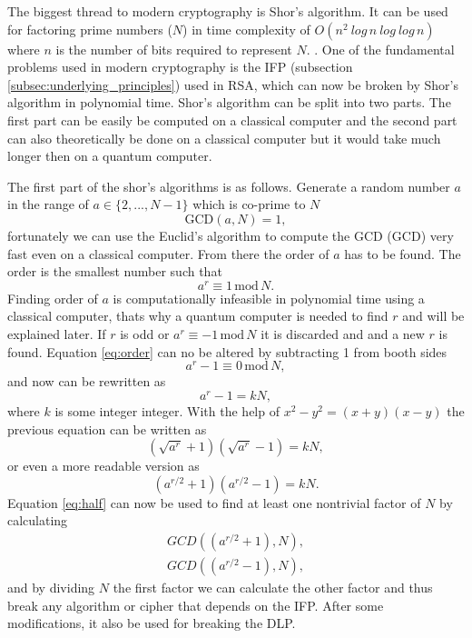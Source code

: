 The biggest thread to modern cryptography is Shor's algorithm. It can be used for factoring prime numbers ($N$) in time complexity of $O(n^2\ log\,n\ log\ log\,n)$ where $n$ is the number of bits required to represent $N$. \cite{Yanofsky2008}. One of the fundamental problems used in modern cryptography is the IFP (subsection \ref{subsec:underlying_principles}) used in RSA, which can now be broken by Shor’s algorithm in polynomial time. Shor's algorithm can be split into two parts. The first part can be easily be computed on a classical computer and the second part can also theoretically be done on a classical computer but it would take much longer then on a quantum computer. 

The first part of the shor's algorithms is as follows. Generate a random number $a$ in the range of $a\in\{2,...,N-1\}$ which is co-prime to $N$
\begin{equation}
  \mathrm{GCD}(a, N) = 1,
\end{equation}
fortunately we can use the Euclid's algorithm to compute the GCD (\acl{GCD}) very fast even on a classical computer. From there the order of $a$ has to be found. The order is the smallest number such that
\begin{equation}
  \label{eq:order}
  a^r \equiv 1\,\mathrm{mod}\,N.
\end{equation}
Finding order of $a$ is computationally infeasible in polynomial time using a classical computer, thats why a quantum computer is needed to find $r$ and will be explained later. If $r$ is odd or $a^r\equiv-1\,\mathrm{mod}\,N$ it is discarded and and a new $r$ is found. Equation \ref{eq:order} can no be altered by subtracting 1 from booth sides
\begin{equation}
  a^r -1\equiv 0\,\mathrm{mod}\,N,
\end{equation}
and now can be rewritten as
\begin{equation}
  a^r -1=kN,
\end{equation}
where $k$ is some integer integer. With the help of $x^2 - y^2=(x+y)(x-y)$ the previous equation can be written as
\begin{equation}
  (\sqrt{a^r}+1)(\sqrt{a^r}-1)= kN,
\end{equation}
or even a more readable version as
\begin{equation}
  \label{eq:half}
  (a^{r/2}+1)(a^{r/2}-1)= kN.
\end{equation}
Equation \ref{eq:half} can now be used to find at least one nontrivial factor of $N$ by calculating
\begin{align}
  GCD((a^{r/2}+1), N), \nonumber \\
  GCD((a^{r/2}-1), N),
\end{align}
and by dividing $N$ the first factor we can calculate the other factor and thus break any algorithm or cipher that depends on the IFP. After some modifications, it also be used for breaking the DLP. \cite{Yanofsky2008}\cite{Pittenger2000}

